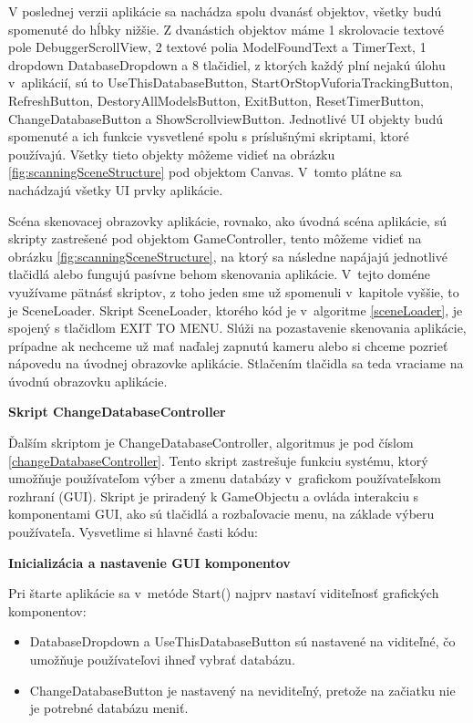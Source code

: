 V poslednej verzii aplikácie sa nachádza spolu dvanásť objektov, všetky budú spomenuté do hĺbky nižšie. Z dvanástich objektov máme 1 skrolovacie textové pole DebuggerScrollView, 2 textové polia ModelFoundText a TimerText, 1 dropdown DatabaseDropdown a 8 tlačidiel, z ktorých každý plní nejakú úlohu v~aplikácií, sú to UseThisDatabaseButton, StartOrStopVuforiaTrackingButton, RefreshButton, DestoryAllModelsButton, ExitButton, ResetTimerButton, ChangeDatabaseButton a ShowScrollviewButton. Jednotlivé UI objekty budú spomenuté a ich funkcie vysvetlené spolu s príslušnými skriptami, ktoré používajú. Všetky tieto objekty môžeme vidieť na obrázku \ref{fig:scanningSceneStructure} pod objektom Canvas. V~tomto plátne sa nachádzajú všetky UI prvky aplikácie.

Scéna skenovacej obrazovky aplikácie, rovnako, ako úvodná scéna aplikácie, sú skripty zastrešené pod objektom GameController, tento môžeme vidieť na obrázku \ref{fig:scanningSceneStructure}, na ktorý sa následne napájajú jednotlivé tlačidlá alebo fungujú pasívne behom skenovania aplikácie. V~tejto doméne využívame pätnásť skriptov, z toho jeden sme už spomenuli v~kapitole vyššie, to je SceneLoader. Skript SceneLoader, ktorého kód je v~algoritme \ref{sceneLoader}, je spojený s tlačidlom EXIT TO MENU. Slúži na pozastavenie skenovania aplikácie, prípadne ak nechceme už mať naďalej zapnutú kameru alebo si chceme pozrieť nápovedu na úvodnej obrazovke aplikácie. Stlačením tlačidla sa teda vraciame na úvodnú obrazovku aplikácie. 

{\large\textbf{Skript ChangeDatabaseController}}

Ďalším skriptom je ChangeDatabaseController, algoritmus je pod číslom \ref{changeDatabaseController}. Tento skript zastrešuje funkciu systému, ktorý umožňuje používateľom výber a zmenu databázy v~grafickom používateľskom rozhraní (GUI). Skript je priradený k GameObjectu a ovláda interakciu s komponentami GUI, ako sú tlačidlá a rozbaľovacie menu, na základe výberu používateľa. Vysvetlime si hlavné časti kódu:

{\small\textbf{Inicializácia a nastavenie GUI komponentov}}

Pri štarte aplikácie sa v~metóde Start() najprv nastaví viditeľnosť grafických komponentov:

\begin{itemize}
    \item DatabaseDropdown a UseThisDatabaseButton sú nastavené na viditeľné, čo umožňuje používateľovi ihneď vybrať databázu.
    \item ChangeDatabaseButton je nastavený na neviditeľný, pretože na začiatku nie je potrebné databázu meniť.
\end{itemize}


